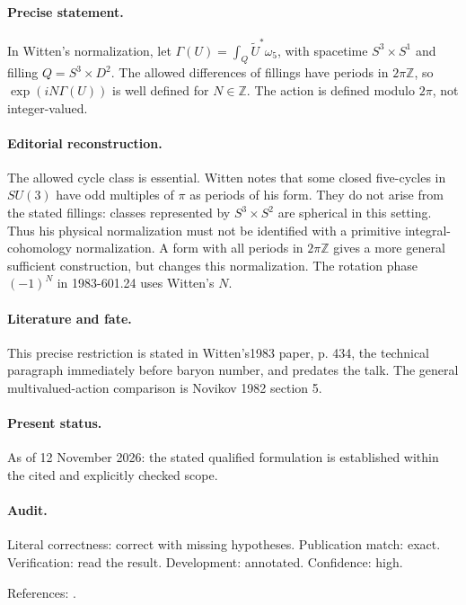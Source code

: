 \paragraph{Precise statement.} In Witten's normalization, let \(\Gamma(U)=\int_Q\widetilde U^*\omega_5\), with spacetime \(S^3\times S^1\) and filling \(Q=S^3\times D^2\). The allowed differences of fillings have periods in \(2\pi\mathbb Z\), so \(\exp(iN\Gamma(U))\) is well defined for \(N\in\mathbb Z\). The action is defined modulo \(2\pi\), not integer-valued.

\paragraph{Editorial reconstruction.} The allowed cycle class is essential. Witten notes that some closed five-cycles in \(SU(3)\) have odd multiples of \(\pi\) as periods of his form. They do not arise from the stated fillings: classes represented by \(S^3\times S^2\) are spherical in this setting. Thus his physical normalization must not be identified with a primitive integral-cohomology normalization. A form with all periods in \(2\pi\mathbb Z\) gives a more general sufficient construction, but changes this normalization. The rotation phase \((-1)^N\) in 1983-601.24 uses Witten's \(N\).

\paragraph{Literature and fate.} This precise restriction is stated in Witten's1983 paper, p. 434, the technical paragraph immediately before baryon number, and predates the talk. The general multivalued-action comparison is Novikov 1982 section 5. \cite{witten1983current,novikov1982hamiltonian}

\paragraph{Present status.} As of 12 November 2026: the stated qualified formulation is established within the cited and explicitly checked scope.

\paragraph{Audit.} Literal correctness: correct with missing hypotheses. Publication match: exact. Verification: read the result. Development: annotated. Confidence: high.

\noindent References: \citep{witten1983current,novikov1982hamiltonian}.\par

